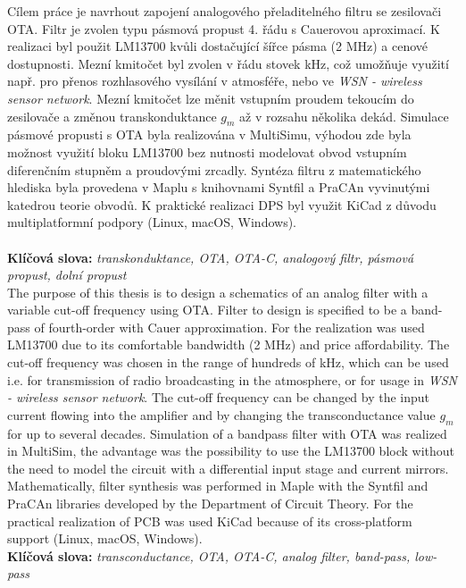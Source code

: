 \noindent Cílem práce je navrhout zapojení analogového přeladitelného filtru se zesilovači OTA. Filtr je zvolen typu pásmová propust 4. řádu s Cauerovou aproximací. K realizaci byl použit LM13700 kvůli dostačující šířce pásma (2 MHz) a cenové dostupnosti. Mezní kmitočet byl zvolen v řádu stovek kHz, což umožňuje využití např. pro přenos rozhlasového vysílání v atmosféře, nebo ve \textit{WSN - wireless sensor network}. Mezní kmitočet lze měnit vstupním proudem tekoucím do zesilovače a změnou transkonduktance $g_m$ až v rozsahu několika dekád. Simulace pásmové propusti s OTA byla realizována v MultiSimu, výhodou zde byla možnost využití bloku LM13700 bez nutnosti modelovat obvod vstupním diferenčním stupněm a proudovými zrcadly. Syntéza filtru z matematického hlediska byla provedena v Maplu s knihovnami Syntfil a PraCAn vyvinutými katedrou teorie obvodů. K praktické realizaci DPS byl využit KiCad z důvodu multiplatformní podpory (Linux, macOS, Windows). \\
\\
\noindent \textbf{Klíčová slova:} \textit{transkonduktance, OTA, OTA-C, analogový filtr, pásmová propust, dolní propust}\\

\noindent The purpose of this thesis is to design a schematics of an analog filter with a variable cut-off frequency using OTA. Filter to design is specified to be a band-pass of fourth-order with Cauer approximation. For the realization was used LM13700 due to its comfortable bandwidth (2 MHz) and price affordability. The cut-off frequency was chosen in the range of hundreds of kHz, which can be used i.e. for transmission of radio broadcasting in the atmosphere, or for usage in \textit{WSN - wireless sensor network}. The cut-off frequency can be changed by the input current flowing into the amplifier and by changing the transconductance value $g_m$ for up to several decades. Simulation of a bandpass filter with OTA was realized in MultiSim, the advantage was the possibility to use the LM13700 block without the need to model the circuit with a differential input stage and current mirrors. Mathematically, filter synthesis was performed in Maple with the Syntfil and PraCAn libraries developed by the Department of Circuit Theory. For the practical realization of PCB was used KiCad because of its cross-platform support (Linux, macOS, Windows). \\

\noindent \textbf{Klíčová slova:} \textit{transconductance, OTA, OTA-C, analog filter, band-pass, low-pass} \\